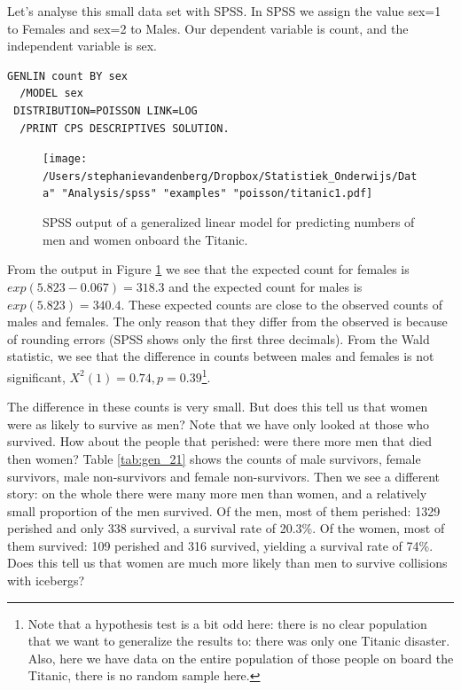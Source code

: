 \documentclass[]{book}\usepackage[]{graphicx}\usepackage[]{color}
\begin{document}
Let's analyse this small data set with SPSS. In SPSS we assign the value sex=1 to Females and sex=2 to Males. Our dependent variable is count, and the independent variable is sex.

\begin{verbatim}
GENLIN count BY sex
  /MODEL sex
 DISTRIBUTION=POISSON LINK=LOG
  /PRINT CPS DESCRIPTIVES SOLUTION.
\end{verbatim}


\begin{figure}[h]
    \begin{center}
       \texttt{[image: /Users/stephanievandenberg/Dropbox/Statistiek\_Onderwijs/Data" "Analysis/spss" "examples" "poisson/titanic1.pdf]}
    \end{center}
     \caption{SPSS output of a generalized linear model for predicting numbers of men and women onboard the Titanic.}
    \label{fig:titanic1}
\end{figure}


From the output in Figure \ref{fig:titanic1} we see that the expected count for females is $exp(5.823-0.067)=318.3$ and the expected count for males is $exp(5.823)=340.4$. These expected counts are close to the observed counts of males and females. The only reason that they differ from the observed is because of rounding errors (SPSS shows only the first three decimals). From the Wald statistic, we see that the difference in counts between males and females is not significant, $X^2(1)=0.74, p=0.39$\footnote{Note that a hypothesis test is a bit odd here: there is no clear population that we want to generalize the results to: there was only one Titanic disaster. Also, here we have data on the entire population of those people on board the Titanic, there is no random sample here.}.

The difference in these counts is very small. But does this tell us that women were as likely to survive as men? Note that we have only looked at those who survived. How about the people that perished: were there more men that died then women? Table \ref{tab:gen_21} shows the counts of male survivors, female survivors, male non-survivors and female non-survivors. Then we see a different story: on the whole there were many more men than women, and a relatively small proportion of the men survived. Of the men, most of them perished: 1329 perished and only 338 survived, a survival rate of 20.3\%. Of the women, most of them survived: 109 perished and 316 survived, yielding a survival rate of 74\%. Does this tell us that women are much more likely than men to survive collisions with icebergs?
\end{document}
